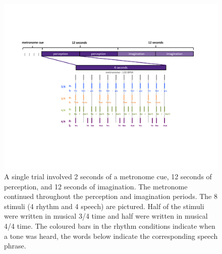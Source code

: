 \documentclass[utf8]{frontiersSCNS} %
\begin{document}
\begin{figure}[h!]
\begin{center}
\includegraphics[width=17cm]{Figures/SpeechFigure}
\end{center}
\caption{A single trial involved 2 seconds of a metronome cue, 12 seconds of perception, and 12 seconds of imagination. The metronome continued throughout the perception and imagination periods. The 8 stimuli (4 rhythm and 4 speech) are pictured. Half of the stimuli were written in musical 3/4 time and half were written in musical 4/4 time. The coloured bars in the rhythm conditions indicate when a tone was heard, the words below indicate the corresponding speech phrase.}
\label{fig:stimuli}
\end{figure}
\end{document}
